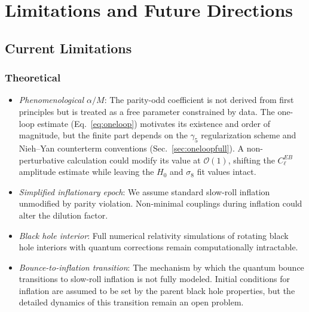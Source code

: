 \documentclass[aps,prd,twocolumn,superscriptaddress,showpacs,preprintnumbers,nofootinbib,longbibliography,floatfix]{revtex4-2}
\begin{document}


\section{Limitations and Future Directions}\label{sec:limitations}%
\label{sec:futuredirections}

\subsection{Current Limitations}

\subsubsection{Theoretical}

\begin{itemize}[leftmargin=*]
\item \textit{Phenomenological $\alpha/M$}: The parity-odd coefficient is not derived from first principles but is treated as a free parameter constrained by data. The one-loop estimate (Eq.~\ref{eq:oneloop}) motivates its existence and order of magnitude, but the finite part depends on the $\gamma_5$ regularization scheme and Nieh--Yan counterterm conventions (Sec.~\ref{sec:oneloopfull}). A non-perturbative calculation could modify its value at $\mathcal{O}(1)$, shifting the $C_\ell^{EB}$ amplitude estimate while leaving the $H_0$ and $\sigma_8$ fit values intact.

\item \textit{Simplified inflationary epoch}: We assume standard slow-roll inflation unmodified by parity violation. Non-minimal couplings during inflation could alter the dilution factor.

\item \textit{Black hole interior}: Full numerical relativity simulations of rotating black hole interiors with quantum corrections remain computationally intractable.

\item \textit{Bounce-to-inflation transition}: The mechanism by which the quantum bounce transitions to slow-roll inflation is not fully modeled. Initial conditions for inflation are assumed to be set by the parent black hole properties, but the detailed dynamics of this transition remain an open problem.
\end{itemize}
\end{document}
